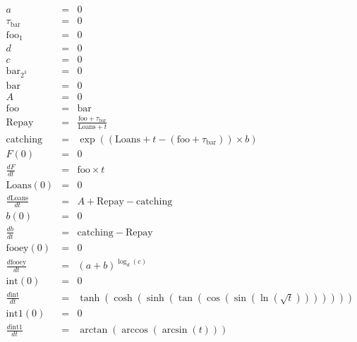 \documentclass{article}
\begin{document}
\begin{eqnarray*}
a&=&0\\
\tau_{{\mathrm{bar}}}&=&0\\
\mathrm{foo}_{1}&=&0\\
d&=&0\\
c&=&0\\
\mathrm{bar}_{2^{3}}&=&0\\
\mathrm{bar}&=&0\\
A&=&0\\
\mathrm{foo}&=&\mathrm{bar}\\
\mathrm{Repay}&=&\frac{\mathrm{foo}+\tau_{{\mathrm{bar}}}}{\mathrm{Loans}+ t }\\
\mathrm{catching}&=&\exp\left(\left(\mathrm{Loans}+ t -\left(\mathrm{foo}+\tau_{{\mathrm{bar}}}\right)\right)\times b\right)\\
F(0)&=&0\\
\frac{ d F}{dt} &=&\mathrm{foo}\times  t \\
\mathrm{Loans}(0)&=&0\\
\frac{ d \mathrm{Loans}}{dt} &=&A+\mathrm{Repay}-\mathrm{catching}\\
b(0)&=&0\\
\frac{ d b}{dt} &=&\mathrm{catching}-\mathrm{Repay}\\
\mathrm{fooey}(0)&=&0\\
\frac{ d \mathrm{fooey}}{dt} &=&\left(a+b\right)^{\log_{d}\left(c\right)}\\
\mathrm{int}(0)&=&0\\
\frac{ d \mathrm{int}}{dt} &=&\tanh\left(\cosh\left(\sinh\left(\tan\left(\cos\left(\sin\left(\ln\left(\sqrt{ t }\right)\right)\right)\right)\right)\right)\right)\\
\mathrm{int1}(0)&=&0\\
\frac{ d \mathrm{int1}}{dt} &=&\arctan\left(\arccos\left(\arcsin\left( t \right)\right)\right)\\
\end{eqnarray*}
\end{document}
